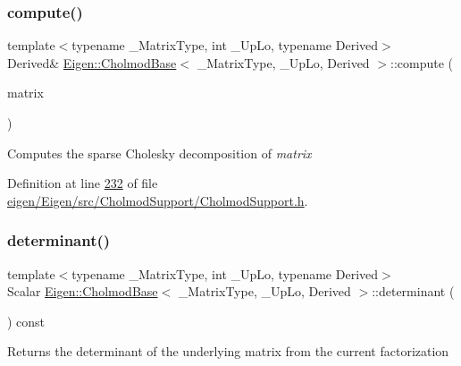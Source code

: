 \subsubsection{\texorpdfstring{compute()}{compute()}\hspace{0.1cm}{\footnotesize\ttfamily [2/2]}}
{\footnotesize\ttfamily template$<$typename \+\_\+\+Matrix\+Type, int \+\_\+\+Up\+Lo, typename Derived$>$ \\
Derived\& \hyperlink{class_eigen_1_1_cholmod_base}{Eigen\+::\+Cholmod\+Base}$<$ \+\_\+\+Matrix\+Type, \+\_\+\+Up\+Lo, Derived $>$\+::compute (\begin{DoxyParamCaption}\item[{const Matrix\+Type \&}]{matrix }\end{DoxyParamCaption})\hspace{0.3cm}{\ttfamily [inline]}}

Computes the sparse Cholesky decomposition of {\itshape matrix} 

Definition at line \hyperlink{eigen_2_eigen_2src_2_cholmod_support_2_cholmod_support_8h_source_l00232}{232} of file \hyperlink{eigen_2_eigen_2src_2_cholmod_support_2_cholmod_support_8h_source}{eigen/\+Eigen/src/\+Cholmod\+Support/\+Cholmod\+Support.\+h}.

\mbox{\label{class_eigen_1_1_cholmod_base_ab4ffb4a9735ad7e81a01d5789ce96547}} 
\subsubsection{\texorpdfstring{determinant()}{determinant()}\hspace{0.1cm}{\footnotesize\ttfamily [1/2]}}
{\footnotesize\ttfamily template$<$typename \+\_\+\+Matrix\+Type, int \+\_\+\+Up\+Lo, typename Derived$>$ \\
Scalar \hyperlink{class_eigen_1_1_cholmod_base}{Eigen\+::\+Cholmod\+Base}$<$ \+\_\+\+Matrix\+Type, \+\_\+\+Up\+Lo, Derived $>$\+::determinant (\begin{DoxyParamCaption}{ }\end{DoxyParamCaption}) const\hspace{0.3cm}{\ttfamily [inline]}}

\begin{DoxyReturn}{Returns}
the determinant of the underlying matrix from the current factorization 
\end{DoxyReturn}



